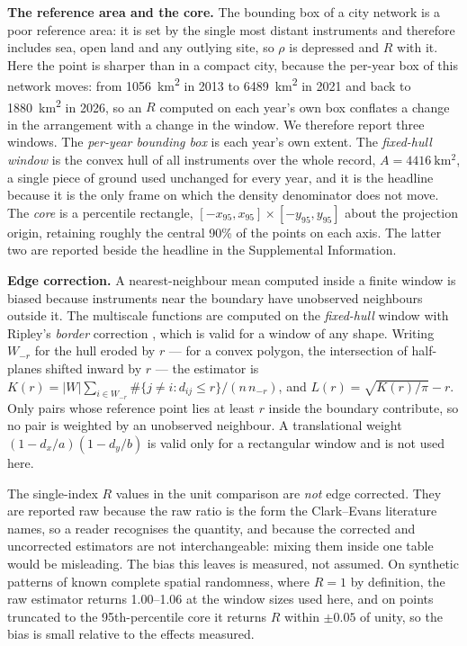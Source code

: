 \documentclass[fleqn,10pt,lineno]{wlpeerj}
\begin{document}
\noindent\textbf{The reference area and the core.} The bounding box of a city network is a
poor reference area: it is set by the single most distant instruments and therefore
includes sea, open land and any outlying site, so $\rho$ is depressed and $R$ with it. Here
the point is sharper than in a compact city, because the per-year box of this network moves:
from \SI{1056}{\kilo\meter\squared} in 2013 to \SI{6489}{\kilo\meter\squared} in 2021
and back to \SI{1880}{\kilo\meter\squared} in 2026, so an $R$ computed on each year's own box
conflates a change in the arrangement with a change in the window. We therefore report three
windows. The \emph{per-year bounding box} is each year's own extent. The
\emph{fixed-hull window} is the convex hull of all instruments over the whole record,
$A = \SI{4416}{\kilo\meter\squared}$, a single piece of ground used unchanged for every year,
and it is the headline because it is the only frame on which the density denominator does not
move. The \emph{core} is a percentile rectangle, $[-x_{95}, x_{95}] \times [-y_{95}, y_{95}]$
about the projection origin, retaining roughly the central 90\% of the points on each axis.
The latter two are reported beside the headline in the Supplemental Information.

\noindent\textbf{Edge correction.} A nearest-neighbour mean computed inside a finite window
is biased because instruments near the boundary have unobserved neighbours outside it. The
multiscale functions are computed on the \emph{fixed-hull}
window with Ripley's \emph{border} correction \citep{ripley1977modelling}, which is valid for a
window of any shape.
Writing $W_{-r}$ for the hull eroded by $r$ --- for a convex polygon, the intersection of
half-planes shifted inward by $r$ --- the estimator is
$K(r) = |W| \sum_{i \in W_{-r}} \#\{j \neq i : d_{ij} \le r\} \big/ (n\,n_{-r})$, and
$L(r) = \sqrt{K(r)/\pi} - r$. Only pairs whose reference point lies at least $r$ inside the
boundary contribute, so no pair is weighted by an unobserved neighbour. A translational weight
$(1-d_x/a)(1-d_y/b)$ is valid only for a rectangular window and is not used here.

The single-index $R$ values in the unit comparison are \emph{not} edge corrected. They are
reported raw because the raw ratio is the form the Clark--Evans literature names, so a reader
recognises the quantity, and because the corrected and uncorrected estimators are not
interchangeable: mixing them inside one table would be misleading. The bias this leaves is
measured, not assumed. On synthetic patterns of known complete spatial randomness, where
$R = 1$ by definition, the raw estimator returns \num{1.00}--\num{1.06} at the window sizes used
here, and on points truncated to the 95th-percentile core it returns $R$ within $\pm\num{0.05}$
of unity, so the bias is small relative to the effects measured.
\end{document}
